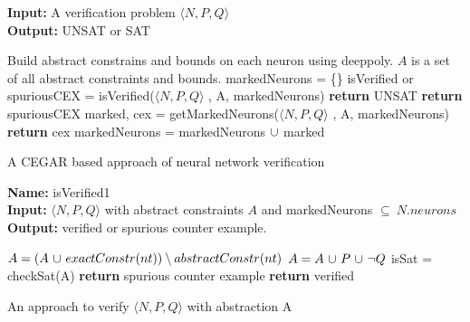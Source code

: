\begin{algorithm}[t]
  \textbf{Input: } A verification problem $\langle N,P,Q \rangle$ \\
  \textbf{Output: } UNSAT or SAT
  \begin{algorithmic}[1]
    \State Build abstract constrains and bounds on each neuron using deeppoly.
    \State $A$ is a set of all abstract constraints and bounds. 
    \State markedNeurons = \{\}
      \State isVerified or spuriousCEX = isVerified($\langle N,P,Q \rangle$ , A, markedNeurons)
        \State \textbf{return} UNSAT
      \Else
          \State \textbf{return} spuriousCEX
        \Else
          \State marked, cex = getMarkedNeurons($\langle N,P,Q \rangle$ , A, markedNeurons)
            \State \textbf{return} cex
          \EndIf
          \State markedNeurons = markedNeurons ${\cup}$ marked
        \EndIf
      \EndIf
    \EndWhile
  \end{algorithmic}
  \caption{A CEGAR based approach of neural network verification}
  \label{algo:main}
\end{algorithm}

\begin{algorithm}[t]
  \textbf{Name: } isVerified1 \\
  \textbf{Input: } $\langle N,P,Q \rangle$ with abstract constraints $A$ and markedNeurons $\subseteq ~ N.neurons$ \\
  \textbf{Output: } verified or spurious counter example. 
  \begin{algorithmic}[1]
      \State $A = (A ~ {\cup} ~ exactConstr(nt)) \setminus abstractConstr(nt)$
    \EndFor
    \State $A = A ~ {\cup} ~ P ~ {\cup} ~ \neg Q$
    \State isSat = checkSat(A)
      \State \textbf{return} spurious counter example
    \Else
      \State \textbf{return} verified
    \EndIf
  \end{algorithmic}
  \caption{An approach to verify $\langle N,P,Q \rangle$ with abstraction A}
  \label{algo:verif1}
\end{algorithm}

